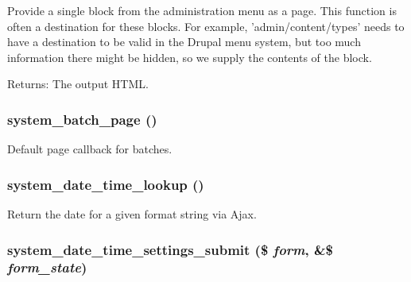 Provide a single block from the administration menu as a page. This function is often a destination for these blocks. For example, 'admin/content/types' needs to have a destination to be valid in the Drupal menu system, but too much information there might be hidden, so we supply the contents of the block.

\begin{Desc}
\item[Returns:]The output HTML. \end{Desc}
\hypertarget{system_8admin_8inc_99e35456b673876eff78a38e53673068}{
\subsubsection[{system\_\-batch\_\-page}]{\setlength{\rightskip}{0pt plus 5cm}system\_\-batch\_\-page ()}}
\label{system_8admin_8inc_99e35456b673876eff78a38e53673068}


Default page callback for batches. \hypertarget{system_8admin_8inc_586fa7e48055bce7f644065259a29a6c}{
\subsubsection[{system\_\-date\_\-time\_\-lookup}]{\setlength{\rightskip}{0pt plus 5cm}system\_\-date\_\-time\_\-lookup ()}}
\label{system_8admin_8inc_586fa7e48055bce7f644065259a29a6c}


Return the date for a given format string via Ajax. \hypertarget{system_8admin_8inc_ee460f082ac9517109ebaef862b5b8d7}{
\subsubsection[{system\_\-date\_\-time\_\-settings\_\-submit}]{\setlength{\rightskip}{0pt plus 5cm}system\_\-date\_\-time\_\-settings\_\-submit (\$ {\em form}, \/  \&\$ {\em form\_\-state})}}
\label{system_8admin_8inc_ee460f082ac9517109ebaef862b5b8d7}


